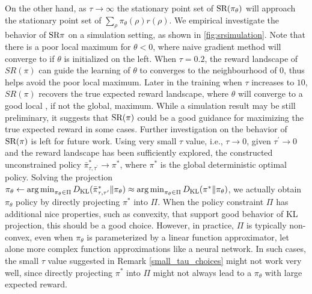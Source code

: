 On the other hand, as $\tau \to \infty$ the stationary point set of $\text{SR}(\pi_\theta)$ will approach the stationary point set of $\sum_{\rho}{ \pi_\theta(\rho) r(\rho) }$.
We empirical investigate the behavior of $\text{SR}{\pi}$ on a simulation setting, as shown in \cref{fig:srsimulation}.
Note that there is a poor local maximum for $\theta <0$, where naive gradient method will converge to if $\theta$ is initialized on the left. 
When $\tau = 0.2$, the reward landscape of $SR(\pi)$ can guide the learning of $\theta$ to converges to the neighbourhood of $0$, thus helps avoid the poor local maximum. Later in the training when $\tau$ increases to $10$, $SR(\pi)$ recovers the true expected reward landscape, where $\theta$ will converge to a good local , if not the global, maximum.
While a simulation result may be still preliminary, it suggests that $\text{SR}(\pi)$ could be a good guidance for maximizing the true expected reward in some cases.
Further investigation on the behavior of $\text{SR}(\pi)$
is left for future work.
Using very small $\tau$ value, i.e., $\tau \to 0$, given $\tau^{\prime} \to 0$ and the reward landscape has been sufficiently explored, the constructed unconstrained policy $\bar{\pi}_{\tau,\tau^{\prime}}^* \to \pi^*$, where $\pi^*$ is the global deterministic optimal policy. Solving the projection $\pi_\theta \leftarrow \operatorname*{arg\,min}_{\pi_\theta \in \Pi}{D_{\mathrm{KL}}(\bar{\pi}_{\tau,\tau^{\prime}}^* \| \pi_\theta}) \approx \operatorname*{arg\,min}_{\pi_\theta \in \Pi}{D_{\mathrm{KL}}(\pi^* \| \pi_\theta})$, we actually obtain $\pi_\theta$ policy by directly projecting $\pi^*$ into $\Pi$. When the policy constraint $\Pi$ has additional nice properties, such as convexity, that support good behavior of KL projection, this should be a good choice.
However, in practice, $\Pi$ is typically non-convex, even when $\pi_\theta$ is parameterized by a linear function approximator, let alone more complex function approximations like a neural network. In such cases, the small $\tau$ value suggested in Remark \ref{small_tau_choices} might not work very well, since directly projecting $\pi^*$ into $\Pi$ might not always lead to a $\pi_\theta$ with large expected reward.

